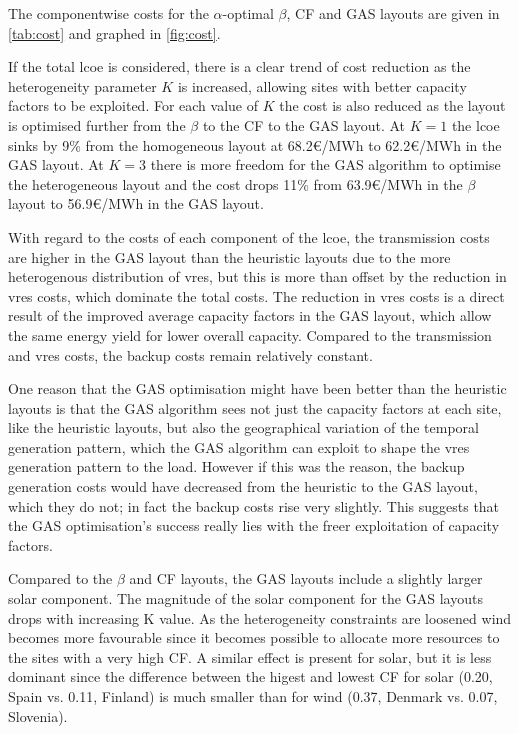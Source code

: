 \documentclass[a4paper, 5p, sort&compress]{elsarticle}%
\begin{document}
The componentwise costs for the $\alpha$-optimal $\beta$, CF and GAS layouts
are given in \cref{tab:cost} and graphed in \cref{fig:cost}.

If the total \gls{lcoe} is considered, there is a clear trend of cost
reduction as the heterogeneity parameter $K$ is increased, allowing
sites with better capacity factors to be exploited. For each
value of $K$ the cost is also reduced as the layout is optimised further
from the $\beta$ to the CF to the GAS layout. At $K=1$ the \gls{lcoe}
sinks by 9\% from the homogeneous layout at 68.2\euro/MWh to
62.2\euro/MWh in the GAS layout. At $K=3$ there is more freedom for
the GAS algorithm to optimise the heterogeneous layout and the cost
drops 11\% from 63.9\euro/MWh in the $\beta$ layout to 56.9\euro/MWh
in the GAS layout.

With regard to the costs of each component of the \gls{lcoe}, the
transmission costs are higher in the GAS layout than the heuristic
layouts due to the more heterogenous distribution of \gls{vres}, but
this is more than offset by the reduction in \gls{vres} costs, which
dominate the total costs. The reduction in \gls{vres} costs is a
direct result of the improved average capacity factors in the GAS
layout, which allow the same energy yield for lower overall
capacity. Compared to the transmission and \gls{vres} costs, the
backup costs remain relatively constant.



One reason that the GAS optimisation might have been better than the
heuristic layouts is that the GAS algorithm sees not just the capacity
factors at each site, like the heuristic layouts, but also the
geographical variation of the temporal generation pattern, which the
GAS algorithm can exploit to shape the \gls{vres} generation pattern
to the load. However if this was the reason, the backup generation
costs would have decreased from the heuristic to the GAS layout, which
they do not; in fact the backup costs rise very slightly. This
suggests that the GAS optimisation's success really lies with the freer
exploitation of capacity factors.


Compared to the $\beta$
and CF layouts, the GAS layouts include a slightly larger solar component. The magnitude of the
solar component for the GAS layouts drops with increasing K value. As the heterogeneity
constraints are loosened wind becomes more favourable since it becomes possible to allocate
more resources to the sites with a very high CF. A similar effect is present for solar, but it
is less dominant since the difference between the higest and lowest CF for solar (0.20, Spain
vs. 0.11, Finland) is much smaller than for wind (0.37, Denmark vs. 0.07, Slovenia).
\end{document}
